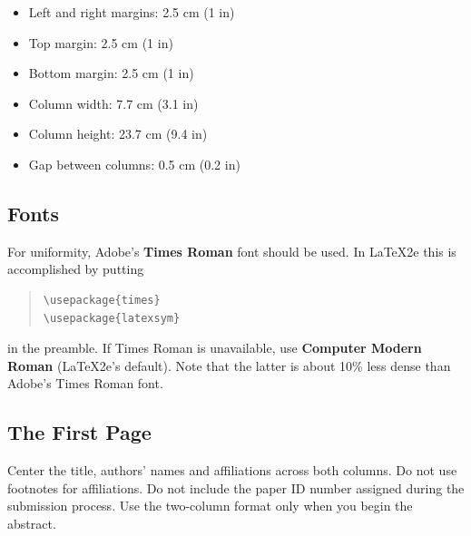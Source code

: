 \documentclass[11pt]{article}
\begin{document}

\begin{itemize}
\itemsep 0mm
\item Left and right margins: 2.5 cm (1 in)
\item Top margin: 2.5 cm (1 in)
\item Bottom margin: 2.5 cm (1 in)
\item Column width: 7.7 cm (3.1 in)
\item Column height: 23.7 cm (9.4 in)
\item Gap between columns: 0.5 cm (0.2 in)
\end{itemize}


\subsection{Fonts}

For uniformity, Adobe's {\bf Times Roman} font should be
used. In \LaTeX2e{} this is accomplished by putting

\begin{quote}
\begin{verbatim}
\usepackage{times}
\usepackage{latexsym}
\end{verbatim}
\end{quote}
in the preamble. If Times Roman is unavailable, use {\bf Computer
  Modern Roman} (\LaTeX2e{}'s default).  Note that the latter is about
  10\% less dense than Adobe's Times Roman font.


\subsection{The First Page}
\label{ssec:first}

Center the title, authors' names and affiliations across both
columns. Do not use footnotes for affiliations. Do not include the
paper ID number assigned during the submission process. Use the
two-column format only when you begin the abstract.
\end{document}
